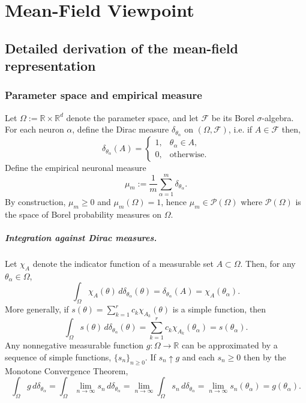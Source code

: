 \chapter{\label{cha:mean-field-appendix}Mean-Field Viewpoint}
\section{\label{app:mf-detailed}Detailed derivation of the mean-field representation}

\subsection{\label{app:mf-empirical-measure}Parameter space and empirical measure}

Let $\Omega := \mathbb{R} \times \mathbb{R}^d$
denote the parameter space, and let $\mathcal{F}$ be its Borel $\sigma$-algebra.
For each neuron $\alpha$, define the Dirac measure $\delta_{\theta_\alpha}$ on
$(\Omega,\mathcal{F})$, i.e. if $A \in \mathcal{F}$ then,
\[
	\delta_{\theta_\alpha}(A)
	=
	\begin{cases}
		1, & \theta_\alpha \in A, \\
		0, & \text{otherwise}.
	\end{cases}
\]
Define the empirical neuronal measure
\begin{equation}
	\mu_m := \frac{1}{m}\sum_{\alpha=1}^m \delta_{\theta_\alpha}.
	\label{eq:app-empirical-measure}
\end{equation}
By construction, $\mu_m \ge 0$ and  $\mu_m(\Omega)=1$, hence $\mu_m \in
	\mathcal P(\Omega)$ where $\mathcal P(\Omega)$ is the space of Borel
probability measures on $\Omega$.

\paragraph{Integration against Dirac measures.}
Let $\chi_A$ denote the indicator function of a measurable set $A \subset \Omega$.
Then, for any $\theta_\alpha \in \Omega$,
\[
	\int_\Omega \chi_A(\theta)\,d\delta_{\theta_\alpha}(\theta)
	=
	\delta_{\theta_\alpha}(A)
	=
	\chi_A(\theta_\alpha).
\]
More generally, if $s(\theta) = \sum_{k=1}^r c_k \chi_{A_k}(\theta)$ is a simple
function, then
\[
	\int_\Omega s(\theta)\,d\delta_{\theta_\alpha}(\theta)
	=
	\sum_{k=1}^r c_k \chi_{A_k}(\theta_\alpha)
	=
	s(\theta_\alpha).
\]
Any nonnegative measurable function $g : \Omega \to \mathbb{R}$ can be approximated by
a sequence of simple functions, $\{s_n\}_{n\ge 0}$. If $s_n \uparrow g$ and each $s_n \ge 0$ then
by the Monotone Convergence Theorem,
\begin{equation}
	\int_\Omega g\,d\delta_{\theta_\alpha}
	= \int_\Omega \lim_{n \to \infty} s_n\,d\delta_{\theta_\alpha}
	=  \lim_{n \to \infty} \int_\Omega s_n\,d\delta_{\theta_\alpha}
	=  \lim_{n \to \infty} s_n(\theta_\alpha)
	= g(\theta_\alpha).
	\label{eq:dirac-integration}
\end{equation}

